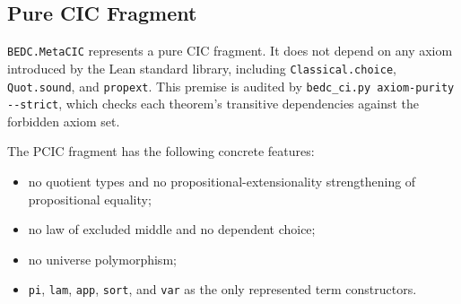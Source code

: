 \subsection{Pure CIC Fragment}\label{subsec:reconstruction-pure-cic-fragment}

\texttt{BEDC.MetaCIC} represents a pure CIC fragment. It does not depend on
any axiom introduced by the Lean standard library, including
\verb|Classical.choice|, \verb|Quot.sound|, and \verb|propext|. This premise
is audited by \verb|bedc_ci.py axiom-purity --strict|, which checks each
theorem's transitive dependencies against the forbidden axiom set.

The PCIC fragment has the following concrete features:

\begin{itemize}
\item no quotient types and no propositional-extensionality strengthening of
propositional equality;
\item no law of excluded middle and no dependent choice;
\item no universe polymorphism;
\item \texttt{pi}, \texttt{lam}, \texttt{app}, \texttt{sort}, and
\texttt{var} as the only represented term constructors.
\end{itemize}
